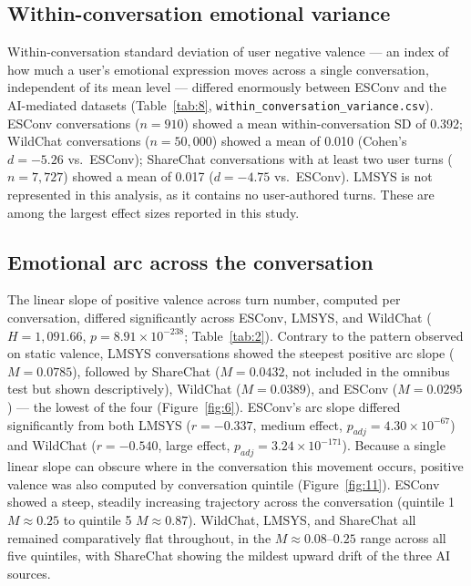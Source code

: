 \documentclass[11pt]{article}
\begin{document}
\subsection{Within-conversation emotional variance}

Within-conversation standard deviation of user negative valence --- an index of how much a user's emotional expression moves across a single conversation, independent of its mean level --- differed enormously between ESConv and the AI-mediated datasets (Table~\ref{tab:8}, \texttt{within\_conversation\_variance.csv}). ESConv conversations ($n = 910$) showed a mean within-conversation SD of 0.392; WildChat conversations ($n = 50{,}000$) showed a mean of 0.010 (Cohen's $d = -5.26$ vs.\ ESConv); ShareChat conversations with at least two user turns ($n = 7{,}727$) showed a mean of 0.017 ($d = -4.75$ vs.\ ESConv). LMSYS is not represented in this analysis, as it contains no user-authored turns. These are among the largest effect sizes reported in this study.

\subsection{Emotional arc across the conversation}

The linear slope of positive valence across turn number, computed per conversation, differed significantly across ESConv, LMSYS, and WildChat ($H = 1{,}091.66$, $p = 8.91 \times 10^{-238}$; Table~\ref{tab:2}). Contrary to the pattern observed on static valence, LMSYS conversations showed the steepest positive arc slope ($M = 0.0785$), followed by ShareChat ($M = 0.0432$, not included in the omnibus test but shown descriptively), WildChat ($M = 0.0389$), and ESConv ($M = 0.0295$) --- the lowest of the four (Figure~\ref{fig:6}). ESConv's arc slope differed significantly from both LMSYS ($r = -0.337$, medium effect, $p_{adj} = 4.30 \times 10^{-67}$) and WildChat ($r = -0.540$, large effect, $p_{adj} = 3.24 \times 10^{-171}$). Because a single linear slope can obscure where in the conversation this movement occurs, positive valence was also computed by conversation quintile (Figure~\ref{fig:11}). ESConv showed a steep, steadily increasing trajectory across the conversation (quintile 1 $M \approx 0.25$ to quintile 5 $M \approx 0.87$). WildChat, LMSYS, and ShareChat all remained comparatively flat throughout, in the $M \approx 0.08$--$0.25$ range across all five quintiles, with ShareChat showing the mildest upward drift of the three AI sources.
\end{document}
